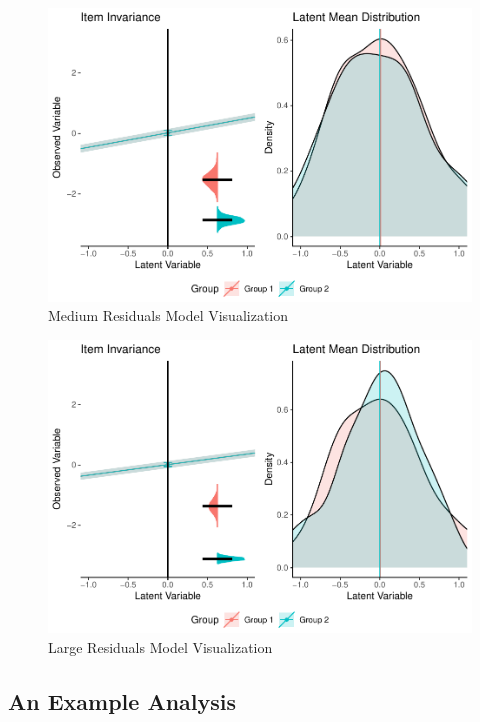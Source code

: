 \documentclass[
  man]{apa7}
\begin{document}
\begin{figure}
\centering
\includegraphics{manuscript_files/figure-latex/med-res-pic-1.pdf}
\caption{\label{fig:med-res-pic}Medium Residuals Model Visualization}
\end{figure}

\begin{figure}
\centering
\includegraphics{manuscript_files/figure-latex/large-res-pic-1.pdf}
\caption{\label{fig:large-res-pic}Large Residuals Model Visualization}
\end{figure}

\hypertarget{an-example-analysis}{%
\subsection{An Example Analysis}\label{an-example-analysis}}
\end{document}
